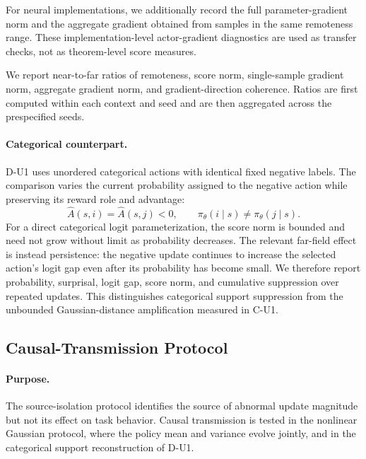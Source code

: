 For neural implementations, we additionally record the full
parameter-gradient norm and the aggregate gradient obtained from samples
in the same remoteness range. These implementation-level actor-gradient
diagnostics are used as transfer checks, not as theorem-level score
measures.

We report near-to-far ratios of remoteness, score norm, single-sample
gradient norm, aggregate gradient norm, and gradient-direction
coherence. Ratios are first computed within each context and seed and
are then aggregated across the prespecified seeds.

\paragraph{Categorical counterpart.}
D-U1 uses unordered categorical actions with identical fixed negative
labels. The comparison varies the current probability assigned to the
negative action while preserving its reward role and advantage:
\begin{equation}
    \widehat A(s,i)
    =
    \widehat A(s,j)
    <0,
    \qquad
    \pi_\theta(i\mid s)
    \neq
    \pi_\theta(j\mid s).
    \label{eq:categorical_source_match}
\end{equation}
For a direct categorical logit parameterization, the score norm is
bounded and need not grow without limit as probability decreases.
The relevant far-field effect is instead persistence: the negative
update continues to increase the selected action's logit gap even after
its probability has become small. We therefore report probability,
surprisal, logit gap, score norm, and cumulative suppression over
repeated updates. This distinguishes categorical support suppression
from the unbounded Gaussian-distance amplification measured in C-U1.


\subsection{Causal-Transmission Protocol}
\label{app:causal_transmission_protocol}

\paragraph{Purpose.}
The source-isolation protocol identifies the source of abnormal update
magnitude but not its effect on task behavior. Causal transmission is tested in the nonlinear
Gaussian protocol, where the policy mean and variance evolve jointly,
and in the categorical support reconstruction of D-U1.

